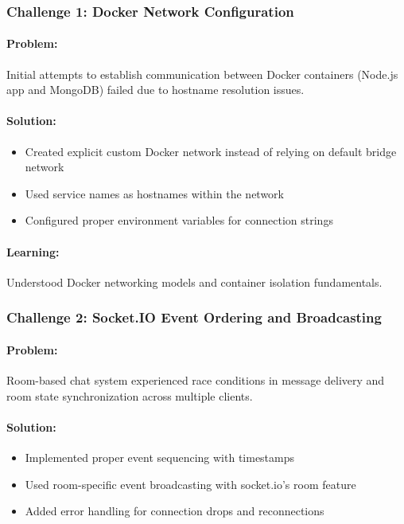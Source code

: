 \subsubsection{Challenge 1: Docker Network Configuration}

\paragraph{Problem:} Initial attempts to establish communication between Docker containers (Node.js app and MongoDB) failed due to hostname resolution issues.

\paragraph{Solution:} 
\begin{itemize}
    \item Created explicit custom Docker network instead of relying on default bridge network
    \item Used service names as hostnames within the network
    \item Configured proper environment variables for connection strings
\end{itemize}

\paragraph{Learning:} Understood Docker networking models and container isolation fundamentals.

\subsubsection{Challenge 2: Socket.IO Event Ordering and Broadcasting}

\paragraph{Problem:} Room-based chat system experienced race conditions in message delivery and room state synchronization across multiple clients.

\paragraph{Solution:}
\begin{itemize}
    \item Implemented proper event sequencing with timestamps
    \item Used room-specific event broadcasting with socket.io's room feature
    \item Added error handling for connection drops and reconnections
\end{itemize}

